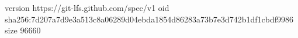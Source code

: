 version https://git-lfs.github.com/spec/v1
oid sha256:7d207a7d9e3a513c8a06289d04ebda1854d86283a73b7e3d742b1df1cbdf9986
size 96660
